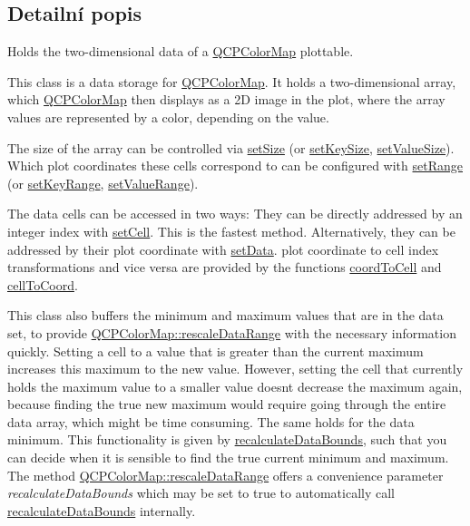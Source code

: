 \subsection{Detailní popis}
Holds the two-\/dimensional data of a \hyperlink{classQCPColorMap}{Q\+C\+P\+Color\+Map} plottable. 

This class is a data storage for \hyperlink{classQCPColorMap}{Q\+C\+P\+Color\+Map}. It holds a two-\/dimensional array, which \hyperlink{classQCPColorMap}{Q\+C\+P\+Color\+Map} then displays as a 2\+D image in the plot, where the array values are represented by a color, depending on the value.

The size of the array can be controlled via \hyperlink{classQCPColorMapData_a0d9ff35c299d0478b682bfbcdd9c097e}{set\+Size} (or \hyperlink{classQCPColorMapData_ac7ef70e383aface34b44dbde49234b6b}{set\+Key\+Size}, \hyperlink{classQCPColorMapData_a0893c9e3914513048b45e3429ffd16f2}{set\+Value\+Size}). Which plot coordinates these cells correspond to can be configured with \hyperlink{classQCPColorMapData_aad9c1c7c703c1339489fc730517c83d4}{set\+Range} (or \hyperlink{classQCPColorMapData_a0738c485f3c9df9ea1241b7a8bb6a86e}{set\+Key\+Range}, \hyperlink{classQCPColorMapData_ada1b2680ba96a5f4175b6d341cf75d23}{set\+Value\+Range}).

The data cells can be accessed in two ways\+: They can be directly addressed by an integer index with \hyperlink{classQCPColorMapData_a8e75eaf8746596319032a93f3d2d0683}{set\+Cell}. This is the fastest method. Alternatively, they can be addressed by their plot coordinate with \hyperlink{classQCPColorMapData_afd2083ccfd6987ec94aa7ef8e91ca39a}{set\+Data}. plot coordinate to cell index transformations and vice versa are provided by the functions \hyperlink{classQCPColorMapData_a26e33c5ec7094b60136350bcd77d3737}{coord\+To\+Cell} and \hyperlink{classQCPColorMapData_ac96d6e84befe7b9951b5da6d4d4a2a47}{cell\+To\+Coord}.

This class also buffers the minimum and maximum values that are in the data set, to provide \hyperlink{classQCPColorMap_a856608fa3dd1cc290bcd5f29a5575774}{Q\+C\+P\+Color\+Map\+::rescale\+Data\+Range} with the necessary information quickly. Setting a cell to a value that is greater than the current maximum increases this maximum to the new value. However, setting the cell that currently holds the maximum value to a smaller value doesn\textquotesingle{}t decrease the maximum again, because finding the true new maximum would require going through the entire data array, which might be time consuming. The same holds for the data minimum. This functionality is given by \hyperlink{classQCPColorMapData_ab235ade8a4d64bd3adb26a99b3dd57ee}{recalculate\+Data\+Bounds}, such that you can decide when it is sensible to find the true current minimum and maximum. The method \hyperlink{classQCPColorMap_a856608fa3dd1cc290bcd5f29a5575774}{Q\+C\+P\+Color\+Map\+::rescale\+Data\+Range} offers a convenience parameter {\itshape recalculate\+Data\+Bounds} which may be set to true to automatically call \hyperlink{classQCPColorMapData_ab235ade8a4d64bd3adb26a99b3dd57ee}{recalculate\+Data\+Bounds} internally. 

